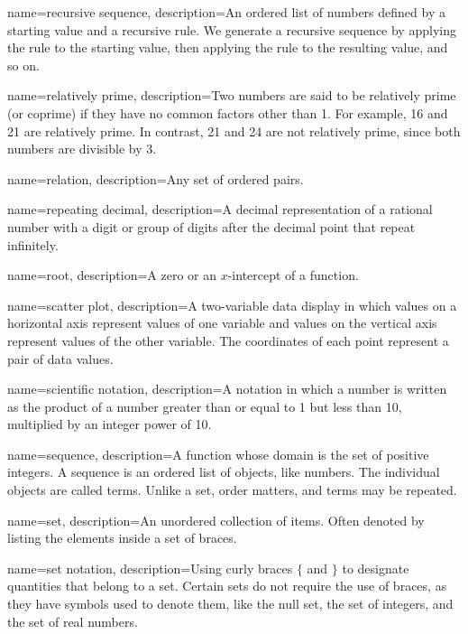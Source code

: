  {
	name=recursive sequence,
	description={An ordered list of numbers defined by a starting value and a recursive rule. We generate a recursive sequence by applying the rule to the starting value, then applying the rule to the resulting value, and so on.}
}

 {
	name=relatively prime,
	description={Two numbers are said to be relatively prime (or coprime) if they have no common factors other than 1. For example, 16 and 21 are relatively prime. In contrast, 21 and 24 are not relatively prime, since both numbers are divisible by 3.}
}

 {
	name=relation,
	description={Any set of ordered pairs.}
}

 {
	name=repeating decimal,
	description={A decimal representation of a rational number with a digit or group of digits after the decimal point that repeat infinitely.}
}

 {
	name=root,
	description={A zero or an $x$-intercept of a function.}
}

 {
	name=scatter plot,
	description={A two-variable data display in which values on a horizontal axis represent values of one variable and values on the vertical axis represent values of the other variable. The coordinates of each point represent a pair of data values.}
}

 {
	name=scientific notation,
	description={A notation in which a number is written as the product of a number greater than or equal to 1 but less than 10, multiplied by an integer power of 10.}
}

 {
	name=sequence,
	description={A function whose domain is the set of positive integers. A sequence is an ordered list of objects, like numbers. The individual objects are called terms. Unlike a set, order matters, and terms may be repeated.}
}

 {
	name=set,
	description={An unordered collection of items. Often denoted by listing the elements inside a set of braces.}
}

 {
	name=set notation,
	description={Using curly braces $\{$ and $\}$ to designate quantities that belong to a set. Certain sets do not require the use of braces, as they have symbols used to denote them, like the \gls{null set}, the set of \glspl{integer}, and the set of \glspl{real number}.}
}

